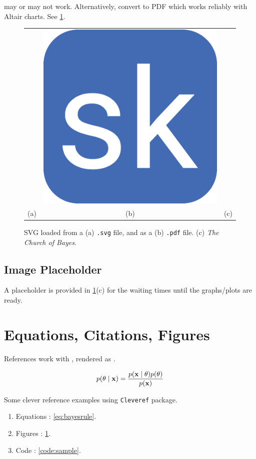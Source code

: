 \documentclass{article}
\begin{document}
\vrb{} may or may not work. Alternatively, convert to PDF which works reliably with Altair charts. See \cref{fig:svg_pdf}.

\begin{figure}[ht]
    \centering
    \begin{tabular}{ccc}
         & \includegraphics[width=0.15\linewidth]{favicon.pdf} &
         \\
        (a) & (b) & (c)
    \end{tabular}
    \caption{SVG loaded from a (a) \texttt{.svg} file, and as a (b) \texttt{.pdf} file. (c) \emph{The Church of Bayes}. }
    \label{fig:svg_pdf}
\end{figure}    

\subsection{Image Placeholder}

A placeholder is provided in \cref{fig:svg_pdf}(c) for the waiting times until the graphs/plots are ready.

\section{Equations, Citations, Figures}

References work with , rendered as \citet{kapoor2020variational}.

\begin{align}
p(\theta \mid {\ensuremath{\boldsymbol{\mathbf{x}}}}) = \frac{p({\boldsymbol{\mathbf{x}}}\mid\theta)p(\theta)}{p({\boldsymbol{\mathbf{x}}})} \label{eq:bayesrule}
\end{align}

Some clever reference examples using \texttt{Cleveref} package.

\begin{enumerate}
\item Equations : \cref{eq:bayesrule}.
\item Figures : \cref{fig:svg_pdf}.
\item Code : \cref{code:sample}.
\end{enumerate}
\end{document}
